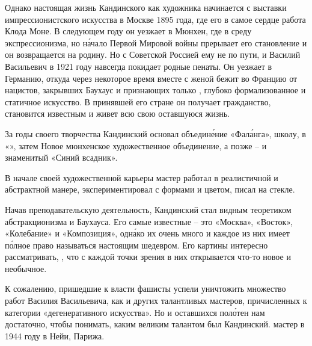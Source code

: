 Однако настоящая жизнь Кандинского как художника начинается с выставки импрессионистского искусства в Москве 1895 года, где его в самое сердце  работа Клода Моне.
В следующем году он уезжает в Мюнхен, где  в среду экспрессионизма, но н\'{а}чало Первой Мировой войны прерывает его становление и он возвращается на родину. Но с Советской Россией ему не по пути, и Василий Васильевич в 1921 году навсегда покидает родные пенаты. Он уезжает в Германию, откуда через некоторое время вместе с женой бежит во Францию от нацистов, закрывших Баухаус и признающих только , глубоко формализованное и статичное искусство. В принявшей его стране он получает гражданство, становится известным и живет всю свою оставшуюся жизнь.

За годы своего творчества Кандинский основал объедин\'{е}ние «Фал\'{а}нга», школу,  в «», затем  Новое мюнхенское художественное объединение, а позже -- и знаменитый «Синий всадник».

В начале своей художественной карьеры мастер работал в реалистичной и  абстрактной манере, экспериментировал с формами и цветом, писал на стекле.

Начав преподавательскую деятельность, Кандинский  стал видным теоретиком абстракционизма и Баухауса. Его самые известные  -- это «Москва», «Восток», «Колебание» и «Композиция», одн\'{а}ко их очень много и каждое из них имеет п\'{о}лное право называться настоящим шедевром. Его картины  интересно рассматривать,  , что с каждой точки зрения в них открывается что-то новое и необычное.

К сожалению, пришедшие к власти фашисты успели уничтожить множество работ Василия Васильевича, как и других талантливых мастеров, причисленных к категории «дегенеративного искусства». Но и оставшихся пол\'{о}тен нам достаточно, чтобы понимать, каким великим талантом был Кандинский.  мастер в 1944 году в Нейи,  Парижа.


